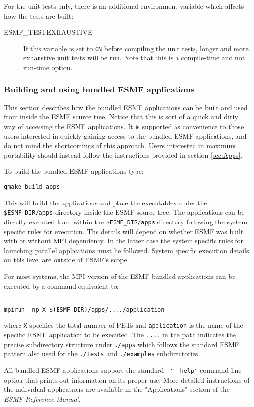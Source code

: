 For the unit tests only, there is an additional environment variable
which affects how the tests are built:
\begin{description}
\item[ESMF\_TESTEXHAUSTIVE]
If this variable is set to {\tt ON} before compiling the unit tests,
longer and more exhaustive unit tests will be run.  Note that this is a
compile-time and not run-time option.
\end{description}


\subsubsection{Building and using bundled ESMF applications}
\label{quickapps}

This section describes how the bundled ESMF applications can be built and used 
from inside the ESMF source tree. Notice that this is sort of a quick and dirty 
way of accessing the ESMF applications. It is supported as convenience to those 
users interested in quickly gaining access to the bundled ESMF applications, and 
do not mind the shortcomings of this approach. Users interested in maximum 
portability should instead follow the instructions provided in section 
\ref{sec:Apps}.

To build the bundled ESMF applications type:
\begin{verbatim}
gmake build_apps
\end{verbatim}
This will build the applications and place the executables under the 
{\tt \$ESMF\_DIR/apps} directory inside the ESMF source tree. The 
applications can be directly executed from within the {\tt \$ESMF\_DIR/apps} 
directory following the system specific rules for execution. The details will 
depend on whether ESMF was built with or without MPI dependency. In the latter 
case the system specific rules for launching parallel applications must be 
followed. System specific execution details on this level are outside of ESMF's 
scope.

For most systems, the MPI version of the ESMF bundled applications can be 
executed by a command equivalent to:

\begin{verbatim}

mpirun -np X $(ESMF_DIR)/apps/..../application

\end{verbatim}
 
where {\tt X} specifies the total number of PETs and {\tt application} is the 
name of the specific ESMF application to be executed. The {\tt ....} in the path 
indicates the precise subdirectory structure under {\tt ./apps} which follows 
the standard ESMF pattern also used for the {\tt ./tests} and {\tt ./examples} 
subdirectories.

All bundled ESMF applications support the standard \verb+ '--help'+ command line 
option that prints out information on its proper use. More detailed instructions 
of the individual applications are available in the "Applications" section of 
the {\it ESMF Reference Manual}.


